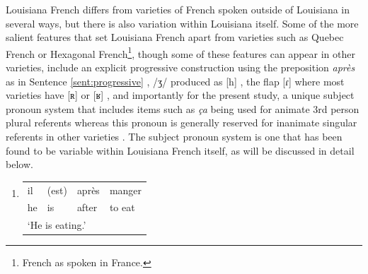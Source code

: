 \documentclass{article}\usepackage[]{graphicx}\usepackage[]{xcolor}
\newcommand{\lexi}[1]{\textit{#1}}
\newcommand{\gloss}[1]{`#1'}
\begin{document}
    Louisiana French differs from varieties of French spoken outside of Louisiana in several ways, but there is also variation within Louisiana itself.
    Some of the more salient features that set Louisiana French apart from varieties such as Quebec French or Hexagonal French\footnote{
      French as spoken in France.
    }, though some of these features can appear in other varieties, include an explicit progressive construction using the preposition \lexi{après} as in Sentence \ref{sent:progressive} \parencite{papen_structural_1997}, /ʒ/ produced as [h] \parencite{carmichael_language_2019, papen_structural_1997}, the flap [ɾ] where most varieties have [ʀ] or [ʁ] \parencite{blainey_first_2013}, and importantly for the present study, a unique subject pronoun system that includes items such as \lexi{ça} being used for animate 3rd person plural referents whereas this pronoun is generally reserved for inanimate singular referents in other varieties \parencite{dajko_ethnic_2009, rottet_language_1995}.
    The subject pronoun system is one that has been found to be variable within Louisiana French itself, as will be discussed in detail below.
    \begin{enumerate}
      \item \label{sent:progressive}
        \begin{tabular}[t]{l l l l}
          il & (est) & après & manger \\
          he & is    & after & to eat \\
          \multicolumn{4}{l}{\gloss{He is eating.}}
        \end{tabular}
    \end{enumerate}


\end{document}
